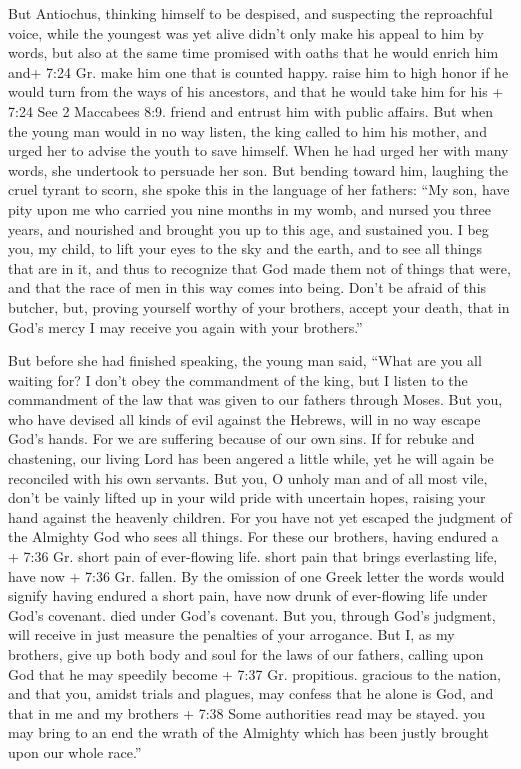  But Antiochus, thinking himself to be despised, and
suspecting the reproachful voice, while the youngest was yet alive
didn't only make his appeal to him by words, but also at the same time
promised with oaths that he would enrich him and+ 7:24 Gr. make him one
that is counted happy. raise him to high honor if he would turn from the
ways of his ancestors, and that he would take him for his + 7:24 See 2
Maccabees 8:9. friend and entrust him with public affairs. 
But when the young man would in no way listen, the king called to him
his mother, and urged her to advise the youth to save himself.
 When he had urged her with many words, she undertook to
persuade her son.  But bending toward him, laughing the
cruel tyrant to scorn, she spoke this in the language of her fathers:
``My son, have pity upon me who carried you nine months in my womb, and
nursed you three years, and nourished and brought you up to this age,
and sustained you.  I beg you, my child, to lift your eyes
to the sky and the earth, and to see all things that are in it, and thus
to recognize that God made them not of things that were, and that the
race of men in this way comes into being.  Don't be afraid
of this butcher, but, proving yourself worthy of your brothers, accept
your death, that in God's mercy I may receive you again with your
brothers.''

 But before she had finished speaking, the young man said,
``What are you all waiting for? I don't obey the commandment of the
king, but I listen to the commandment of the law that was given to our
fathers through Moses.  But you, who have devised all kinds
of evil against the Hebrews, will in no way escape God's hands.
 For we are suffering because of our own sins.
 If for rebuke and chastening, our living Lord has been
angered a little while, yet he will again be reconciled with his own
servants.  But you, O unholy man and of all most vile,
don't be vainly lifted up in your wild pride with uncertain hopes,
raising your hand against the heavenly children.  For you
have not yet escaped the judgment of the Almighty God who sees all
things.  For these our brothers, having endured a + 7:36
Gr. short pain of ever-flowing life. short pain that brings everlasting
life, have now + 7:36 Gr. fallen. By the omission of one Greek letter
the words would signify having endured a short pain, have now drunk of
ever-flowing life under God's covenant. died under God's covenant. But
you, through God's judgment, will receive in just measure the penalties
of your arrogance.  But I, as my brothers, give up both
body and soul for the laws of our fathers, calling upon God that he may
speedily become + 7:37 Gr. propitious. gracious to the nation, and that
you, amidst trials and plagues, may confess that he alone is God,
 and that in me and my brothers + 7:38 Some authorities
read may be stayed. you may bring to an end the wrath of the Almighty
which has been justly brought upon our whole race.''

